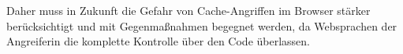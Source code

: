 
Daher muss in Zukunft die Gefahr von Cache-Angriffen im Browser stärker berücksichtigt und mit Gegenmaßnahmen begegnet werden, da Websprachen der Angreiferin die komplette Kontrolle über den Code überlassen.








